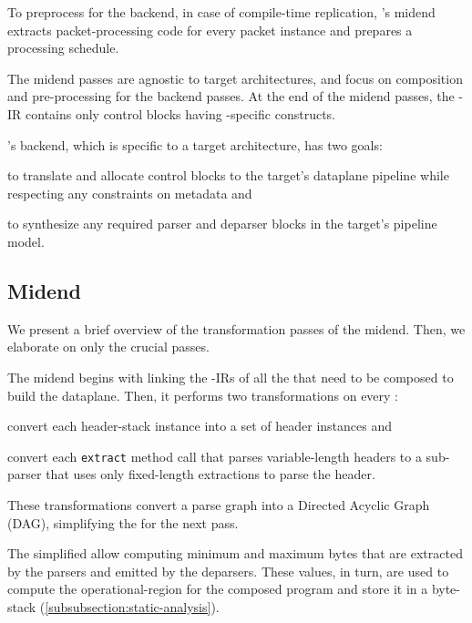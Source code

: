 \documentclass[letterpaper,twocolumn,10pt]{article}
\begin{document}
To preprocess for the backend, in case of compile-time replication,
\ucomp's midend extracts packet-processing code for every packet
instance and prepares a processing schedule.

The midend passes are agnostic to target architectures, and focus on
composition and pre-processing for the backend passes. At the end of
the midend passes, the \ucomp-IR contains only control blocks having
\uarch-specific constructs.

%
\ucomp's backend, which is specific to a target architecture, has two
goals:
\begin{enumerate*}[label=(\roman*)]
  \item to translate and allocate control blocks to the target's
    dataplane pipeline while respecting any constraints on metadata
    and
  \item to synthesize any required parser and deparser blocks in
    the target's pipeline model.
\end{enumerate*}



\subsection{\ucomp Midend}
\label{sec:compiler-midend}
We present a brief overview of the transformation passes of the
midend. Then, we elaborate on only the crucial passes.

The midend begins with linking the \ucomp-IRs of all the \uprograms
that need to be composed to build the dataplane. Then, it performs
two transformations on every \uprogram:
\begin{enumerate*}[label=(\roman*)]
  \item convert each header-stack instance into a set of header
    instances and
  \item convert each \texttt{extract} method call that parses
    variable-length headers to a sub-parser that uses only
    fixed-length extractions to parse the header.
\end{enumerate*}
These transformations convert a parse graph into a Directed Acyclic
Graph (DAG), simplifying the \uprograms for the next pass.

 The simplified \uprograms allow computing
minimum and maximum bytes that are extracted by the parsers and
emitted by the deparsers. These values, in turn, are used to compute
the operational-region for the composed program and store it in a
byte-stack (\cref{subsubsection:static-analysis}).
\end{document}
